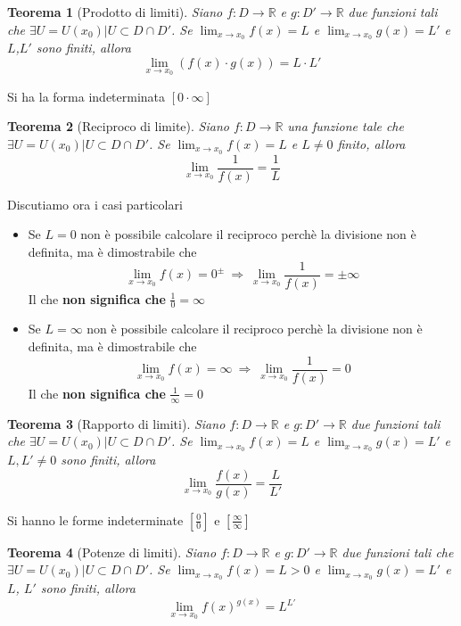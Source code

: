 \documentclass[]{report}
\theoremstyle{definition}
\theoremstyle{remark}
\theoremstyle{plain}
\newtheorem{theor}{Teorema}[chapter]
\numberwithin{equation}{chapter}
\begin{document}
\begin{theor}[Prodotto di limiti]\label{th prodlim}
	Siano $f:D \to \mathbb{R}$ e $g:D' \to \mathbb{R}$ due funzioni tali che $\exists U=U(x_{0}) | U \subset D \cap D'$. Se $\lim_{x \to x_{0}}f(x)=L$ e $\lim_{x \to x_{0}}g(x)=L'$ e $L$,$L'$ sono finiti, allora
	$$\lim_{x \to x_{0}}(f(x) \cdot g(x))=L \cdot L'$$
\end{theor}

Si ha la forma indeterminata $[0 \cdot \infty]$

\begin{theor}[Reciproco di limite]\label{th reclim}
	Siano $f:D \to \mathbb{R}$ una funzione tale che $\exists U=U(x_{0}) | U \subset D \cap D'$. Se $\lim_{x \to x_{0}}f(x)=L$ e $L \neq 0$ finito, allora
	$$\lim_{x \to x_{0}}\frac{1}{f(x)}=\frac{1}{L}$$
\end{theor}

Discutiamo ora i casi particolari
\begin{itemize}
	\item Se $L=0$ non \`{e} possibile calcolare il reciproco perch\`{e} la divisione non \`{e} definita, ma \`{e} dimostrabile che 
	$$\lim_{x \to x_{0}}f(x)=0^\pm \ \Rightarrow \ \lim_{x \to x_{0}}\frac{1}{f(x)}=\pm \infty$$
	Il che \textbf{non significa che} $\frac{1}{0}=\infty$
	\item Se $L=\infty$ non \`{e} possibile calcolare il reciproco perch\`{e} la divisione non \`{e} definita, ma \`{e} dimostrabile che 
	$$\lim_{x \to x_{0}}f(x)=\infty \ \Rightarrow \ \lim_{x \to x_{0}}\frac{1}{f(x)}=0$$
	Il che \textbf{non significa che} $\frac{1}{\infty}=0$
\end{itemize}

\begin{theor}[Rapporto di limiti]\label{th raplim}
	Siano $f:D \to \mathbb{R}$ e $g:D' \to \mathbb{R}$ due funzioni tali che $\exists U=U(x_{0}) | U \subset D \cap D'$. Se $\lim_{x \to x_{0}}f(x)=L$ e $\lim_{x \to x_{0}}g(x)=L'$ e $L,L'\neq 0$ sono finiti, allora
	$$\lim_{x \to x_{0}}\frac{f(x)}{g(x)}= \frac{L}{L'}$$
\end{theor}

Si hanno le forme indeterminate $\left[\frac{0}{0}\right]$ e $\left[\frac{\infty}{\infty}\right]$ 

\begin{theor}[Potenze di limiti]\label{th esplim}
	Siano $f:D \to \mathbb{R}$ e $g:D' \to \mathbb{R}$ due funzioni tali che $\exists U=U(x_{0}) | U \subset D \cap D'$. Se $\lim_{x \to x_{0}}f(x)=L>0$ e $\lim_{x \to x_{0}}g(x)=L'$ e $L$, $L'$ sono finiti, allora
	$$\lim_{x \to x_{0}}f(x)^{g(x)}= L^{L'}$$
\end{theor}
\end{document}
